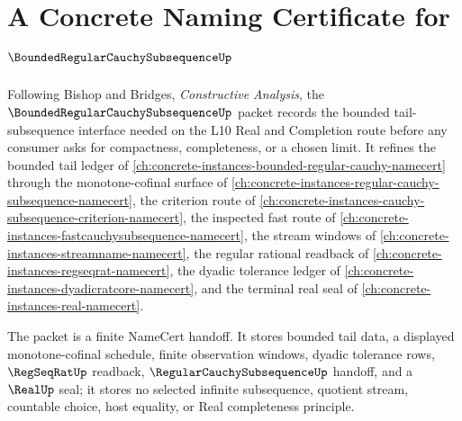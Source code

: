 \chapter{A Concrete Naming Certificate for $\BoundedRegularCauchySubsequenceUp$}
\label{ch:concrete-instances-bounded-regular-cauchy-subsequence-namecert}

Following Bishop and Bridges, \emph{Constructive Analysis}, the $\BoundedRegularCauchySubsequenceUp$ packet records the bounded tail-subsequence interface needed on the L10 Real and Completion route before any consumer asks for compactness, completeness, or a chosen limit. It refines the bounded tail ledger of \autoref{ch:concrete-instances-bounded-regular-cauchy-namecert} through the monotone-cofinal surface of \autoref{ch:concrete-instances-regular-cauchy-subsequence-namecert}, the criterion route of \autoref{ch:concrete-instances-cauchy-subsequence-criterion-namecert}, the inspected fast route of \autoref{ch:concrete-instances-fastcauchysubsequence-namecert}, the stream windows of \autoref{ch:concrete-instances-streamname-namecert}, the regular rational readback of \autoref{ch:concrete-instances-regseqrat-namecert}, the dyadic tolerance ledger of \autoref{ch:concrete-instances-dyadicratcore-namecert}, and the terminal real seal of \autoref{ch:concrete-instances-real-namecert}.

The packet is a finite NameCert handoff. It stores bounded tail data, a displayed monotone-cofinal schedule, finite observation windows, dyadic tolerance rows, $\RegSeqRatUp$ readback, $\RegularCauchySubsequenceUp$ handoff, and a $\RealUp$ seal; it stores no selected infinite subsequence, quotient stream, countable choice, host equality, or Real completeness principle.

